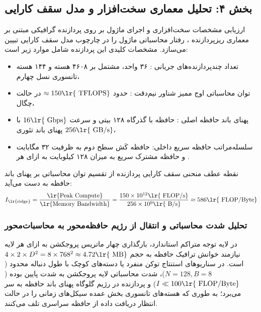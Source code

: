 \subsection*{بخش ۴: تحلیل معماری سخت‌افزار و مدل سقف کارایی }
ارزیابی مشخصات سخت‌افزاری و اجرای ماژول بر روی پردازنده گرافیکی  مبتنی بر معماری ریزپردازنده ، رفتار محاسباتی ماژول را در چارچوب مدل سقف کارایی  تبیین می‌سازد. مشخصات کلیدی این پردازنده شامل موارد زیر است:
\begin{itemize}
    \item تعداد چندپردازنده‌های جریانی : ۳۶ واحد، مشتمل بر ۴۶۰۸ هسته  و ۱۴۴ هسته تانسوری نسل چهارم،
    \item توان محاسباتی اوج ممیز شناور نیم‌دقت : حدود $\approx 150\text{\lr{ TFLOPS}}$ در حالت چگال،
    \item پهنای باند حافظه اصلی : حافظه با گذرگاه ۱۲۸ بیتی و سرعت $16\text{\lr{ Gbps}}$ با پهنای باند تئوری $256\text{\lr{ GB/s}}$،
    \item سلسله‌مراتب حافظه سریع داخلی: حافظه کَش سطح دوم  به ظرفیت ۳۲ مگابایت و حافظه مشترک سریع  به میزان ۱۲۸ کیلوبایت به ازای هر .
\end{itemize}

نقطه عطف منحنی سقف کارایی  پردازنده از تقسیم توان محاسباتی بر پهنای باند حافظه به دست می‌آید:
\begin{equation}
I_{\text{\lr{ridge}}} = \frac{\text{\lr{Peak Compute}}}{\text{\lr{Memory Bandwidth}}} = \frac{150 \times 10^{12}\text{\lr{ FLOP/s}}}{256 \times 10^9\text{\lr{ B/s}}} \approx 586\text{\lr{ FLOP/Byte}}
\end{equation}

\subsubsection*{تحلیل شدت محاسباتی و انتقال از رژیم حافظه‌محور به محاسبات‌محور}
در لایه توجه متراکم استاندارد، بارگذاری چهار ماتریس پروجکشن به ازای هر لایه نیازمند خوانش ترافیک حافظه به حجم $4 \times 2 \times D^2 = 8 \times 768^2 \approx 4.72\text{\lr{ MB}}$ است. در سناریوهای استنتاج توکن منفرد یا دسته‌های کوچک با طول دنباله محدود ($N=128, B=8$)، شدت محاسباتی لایه پروجکشن به شدت پایین بوده ($I \ll 100\text{\lr{ FLOP/Byte}}$) و پردازنده در رژیم گلوگاه پهنای باند حافظه  به سر می‌برد؛ به طوری که هسته‌های تانسوری بخش عمده سیکل‌های زمانی را در حالت انتظار دریافت داده از حافظه سراسری  تلف می‌کنند.

